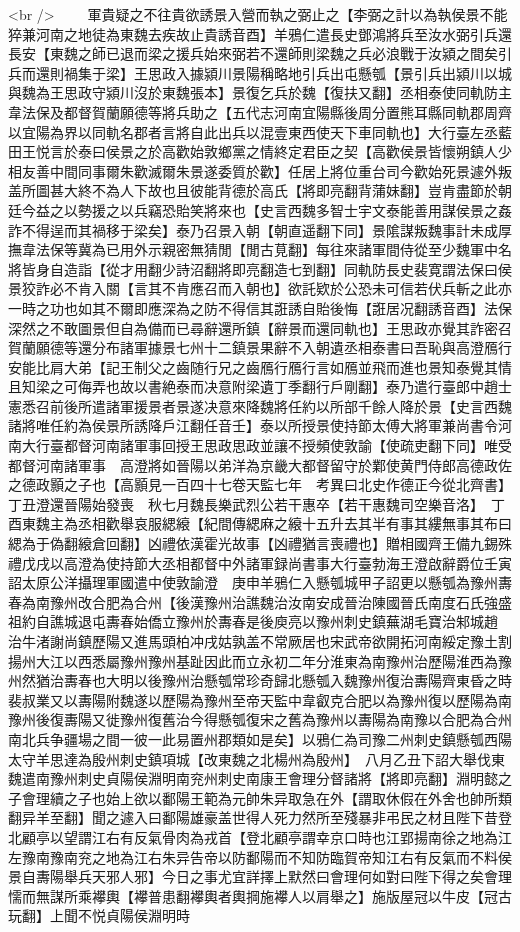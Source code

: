 <br />
　　軍貴疑之不往貴欲誘景入營而執之弼止之【李弼之計以為執侯景不能猝兼河南之地徒為東魏去疾故止貴誘音酉】羊鴉仁遣長史鄧鴻將兵至汝水弼引兵還長安【東魏之師已退而梁之援兵始來弼若不還師則梁魏之兵必浪戰于汝潁之間矣引兵而還則禍集于梁】王思政入據潁川景陽稱略地引兵出屯懸瓠【景引兵出潁川以城與魏為王思政守潁川沒於東魏張本】景復乞兵於魏【復扶又翻】丞相泰使同軌防主韋法保及都督賀蘭願德等將兵助之【五代志河南宜陽縣後周分置熊耳縣同軌郡周齊以宜陽為界以同軌名郡者言將自此出兵以混壹東西使天下車同軌也】大行臺左丞藍田王悦言於泰曰侯景之於高歡始敦鄉黨之情終定君臣之契【高歡侯景皆懷朔鎮人少相友善中間同事爾朱歡滅爾朱景遂委質於歡】任居上將位重台司今歡始死景遽外叛盖所圖甚大終不為人下故也且彼能背德於高氏【將即亮翻背蒲妹翻】豈肯盡節於朝廷今益之以勢援之以兵竊恐貽笑將來也【史言西魏多智士宇文泰能善用謀侯景之姦詐不得逞而其禍移于梁矣】泰乃召景入朝【朝直遥翻下同】景隂謀叛魏事計未成厚撫韋法保等冀為已用外示親密無猜閒【閒古莧翻】每往來諸軍間侍從至少魏軍中名將皆身自造詣【從才用翻少詩沼翻將即亮翻造七到翻】同軌防長史裴寛謂法保曰侯景狡詐必不肯入關【言其不肯應召而入朝也】欲託欵於公恐未可信若伏兵斬之此亦一時之功也如其不爾即應深為之防不得信其誑誘自貽後悔【誑居况翻誘音酉】法保深然之不敢圖景但自為備而已尋辭還所鎮【辭景而還同軌也】王思政亦覺其詐密召賀蘭願德等還分布諸軍據景七州十二鎮景果辭不入朝遺丞相泰書曰吾恥與高澄鴈行安能比肩大弟【記王制父之齒随行兄之齒鴈行鴈行言如鴈並飛而進也景知泰覺其情且知梁之可侮弄也故以書絶泰而决意附梁遺丁季翻行戶剛翻】泰乃遣行臺郎中趙士憲悉召前後所遣諸軍援景者景遂决意來降魏將任約以所部千餘人降於景【史言西魏諸將唯任約為侯景所誘降戶江翻任音壬】泰以所授景使持節太傅大將軍兼尚書令河南大行臺都督河南諸軍事回授王思政思政並讓不授頻使敦諭【使疏吏翻下同】唯受都督河南諸軍事　高澄將如晉陽以弟洋為京畿大都督留守於鄴使黄門侍郎高德政佐之德政顥之子也【高顥見一百四十七卷天監七年　考異曰北史作德正今從北齊書】丁丑澄還晉陽始發喪　秋七月魏長樂武烈公若干惠卒【若干惠魏司空樂音洛】　丁酉東魏主為丞相歡舉哀服緦縗【紀間傳緦麻之縗十五升去其半有事其縷無事其布曰緦為于偽翻縗倉回翻】凶禮依漢霍光故事【凶禮猶言喪禮也】贈相國齊王備九錫殊禮戊戌以高澄為使持節大丞相都督中外諸軍録尚書事大行臺勃海王澄啟辭爵位壬寅詔太原公洋攝理軍國遣中使敦諭澄　庚申羊鴉仁入懸瓠城甲子詔更以懸瓠為豫州夀春為南豫州改合肥為合州【後漢豫州治譙魏治汝南安成晉治陳國晉氏南度石氏強盛祖約自譙城退屯夀春始僑立豫州於夀春是後庾亮以豫州刺史鎮蕪湖毛寶治邾城趙治牛渚謝尚鎮歷陽又進馬頭柏冲戌姑孰盖不常厥居也宋武帝欲開拓河南綏定豫土割揚州大江以西悉屬豫州豫州基趾因此而立永初二年分淮東為南豫州治歷陽淮西為豫州然猶治夀春也大明以後豫州治懸瓠常珍奇歸北懸瓠入魏豫州復治夀陽齊東昏之時裴叔業又以夀陽附魏遂以歷陽為豫州至帝天監中韋叡克合肥以為豫州復以歷陽為南豫州後復夀陽又徙豫州復舊治今得懸瓠復宋之舊為豫州以夀陽為南豫以合肥為合州南北兵争疆場之間一彼一此易置州郡類如是矣】以鴉仁為司豫二州刺史鎮懸瓠西陽太守羊思達為殷州刺史鎮項城【改東魏之北楊州為殷州】　八月乙丑下詔大舉伐東魏遣南豫州刺史貞陽侯淵明南兖州刺史南康王會理分督諸將【將即亮翻】淵明懿之子會理續之子也始上欲以鄱陽王範為元帥朱异取急在外【謂取休假在外舍也帥所類翻异羊至翻】聞之遽入曰鄱陽雄豪盖世得人死力然所至殘暴非弔民之材且陛下昔登北顧亭以望謂江右有反氣骨肉為戎首【登北顧亭謂幸京口時也江郢揚南徐之地為江左豫南豫南兖之地為江右朱异告帝以防鄱陽而不知防臨賀帝知江右有反氣而不料侯景自夀陽舉兵天邪人邪】今日之事尤宜詳擇上默然曰會理何如對曰陛下得之矣會理懦而無謀所乘襻輿【襻普患翻襻輿者輿掆施襻人以肩舉之】施版屋冠以牛皮【冠古玩翻】上聞不悦貞陽侯淵明時